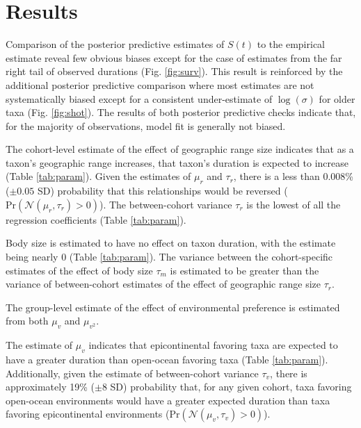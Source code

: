 \documentclass{article}
\begin{document}
\section{Results}


Comparison of the posterior predictive estimates of \(S(t)\) to the empirical estimate reveal few obvious biases except for the case of estimates from the far right tail of observed durations (Fig. \ref{fig:surv}). This result is reinforced by the additional posterior predictive comparison where most estimates are not systematically biased except for a consistent under-estimate of \(\log(\sigma)\) for older taxa (Fig. \ref{fig:shot}). The results of both posterior predictive checks indicate that, for the majority of observations, model fit is generally not biased.

The cohort-level estimate of the effect of geographic range size indicates that as a taxon's geographic range increases, that taxon's duration is expected to increase (Table \ref{tab:param}). Given the estimates of \(\mu_{r}\) and \(\tau_{r}\), there is a less than 0.008\% (\(\pm 0.05\) SD) probability that this relationships would be reversed (\(\mathrm{Pr}\left(\mathcal{N}(\mu_{r}, \tau_{r}) > 0\right)\)). The between-cohort variance \(\tau_{r}\) is the lowest of all the regression coefficients (Table \ref{tab:param}).

Body size is estimated to have no effect on taxon duration, with the estimate being nearly 0 (Table \ref{tab:param}). The variance between the cohort-specific estimates of the effect of body size \(\tau_{m}\) is estimated to be greater than the variance of between-cohort estimates of the effect of geographic range size \(\tau_{r}\). 

The group-level estimate of the effect of environmental preference is estimated from both \(\mu_{v}\) and \(\mu_{v^{2}}\). 

The estimate of \(\mu_{v}\) indicates that epicontinental favoring taxa are expected to have a greater duration than open-ocean favoring taxa (Table \ref{tab:param}). Additionally, given the estimate of between-cohort variance \(\tau_{v}\), there is approximately 19\% (\(\pm 8\) SD) probability that, for any given cohort, taxa favoring open-ocean environments would have a greater expected duration than taxa favoring epicontinental environments (\(\mathrm{Pr}\left(\mathcal{N}(\mu_{v}, \tau_{v}) > 0 \right)\)). 
\end{document}
